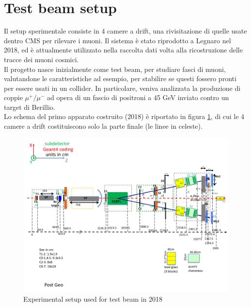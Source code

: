 \documentclass[a4paper,11pt]{book}
\begin{document}
\section{Test beam setup}

Il setup sperimentale consiste in 4 camere a drift, una rivisitazione di quelle usate dentro CMS per rilevare i muoni. Il sistema è stato riprodotto a Legnaro nel 2018, ed è attualmente utilizzato nella raccolta dati volta alla ricostruzione delle tracce dei muoni cosmici.\\
Il progetto nasce inizialmente come test beam, per studiare fasci di muoni, valutandone le caratteristiche ad esempio, per stabilire se questi fossero pronti per essere usati in un collider. In particolare, veniva analizzata la produzione di coppie $\mu^+/\mu^-$ ad opera di un fascio di positroni a 45 GeV inviato contro un target di Berillio.\\
Lo schema del primo apparato costruito (2018) è riportato in figura \ref{fig:lemma_test_beam_2018}, di cui le 4 camere a drift costituiscono solo la parte finale (le linee in celeste).\\
\begin{figure}[hbtp]
\centering
\includegraphics[width=\textwidth,height=0.4\textheight]{pictures/lemma_2018.pdf}
\caption{Experimental setup used for test beam in 2018}
\label{fig:lemma_test_beam_2018}
\end{figure}
\end{document}
